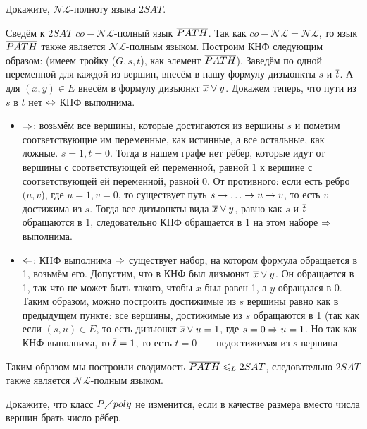 \documentclass[a4paper,12pt]{article}
\begin{document}
\begin{tasknum}{3}
	Докажите, $\mathcal{NL}$-полноту языка $2SAT$.
\end{tasknum}

\begin{solution}
	Сведём к $2SAT$ $co-\mathcal{NL}$-полный язык $\overline{PATH}$. Так как $co-\mathcal{NL} = \mathcal{NL}$, то язык $\overline{PATH}$ также является $\mathcal{NL}$-полным языком. Построим КНФ следующим образом: (имеем тройку ($G, s, t$), как элемент $\overline{PATH}$). Заведём по одной переменной для каждой из вершин, внесём в нашу формулу дизъюнкты $s$ и $\overline{t}$. А для $(x, y) \in E$ внесём в формулу дизъюнкт $\overline{x} \vee y$. Докажем теперь, что пути из $s$ в $t$ нет $\Leftrightarrow$ КНФ выполнима.
	
	\begin{itemize}
		\item $\Rightarrow$: возьмём все вершины, которые достигаются из вершины $s$ и пометим соответствующие им переменные, как истинные, а все остальные, как ложные. $s = 1, t = 0$. Тогда в нашем графе нет рёбер, которые идут от вершины с соответствующей ей переменной, равной $1$ к вершине с соответствующей ей переменной, равной $0$. От противного: если есть ребро $(u,v$), где $u = 1, v=0$, то существует путь $s \rightarrow \ldots \rightarrow u \rightarrow v$, то есть $v$ достижима из $s$. Тогда все дизъюнкты вида $\overline{x} \vee y$, равно как $s$ и $\overline{t}$ обращаются в 1, следовательно КНФ обращается в 1 на этом наборе $\Rightarrow$ выполнима. 
		
		\item $\Leftarrow$: КНФ выполнима $\Rightarrow$ существует набор, на котором формула обращается в 1, возьмём его. Допустим, что в КНФ был дизъюнкт $\overline{x} \vee y$. Он обращается в 1, так что не может быть такого, чтобы $x$ был равен 1, а $y$ обращался в 0. Таким образом, можно построить достижимые из $s$ вершины равно как в предыдущем пункте: все вершины, достижимые из $s$ обращаются в 1 (так как если $(s, u) \in E$, то есть дизъюнкт $\overline{s} \vee u = 1$, где $s = 0 \Rightarrow u = 1$. Но так как КНФ выполнима, то $\overline{t} = 1$, то есть $t=0$~---~недостижимая из $s$ вершина
	\end{itemize}
	
	Таким образом мы построили сводимость $\overline{PATH} \leqslant_L 2SAT$, следовательно $2SAT$ также является $\mathcal{NL}$-полным языком.
	
\end{solution}

\begin{tasknum}{4}
	Докажите, что класс $P \diagup poly$ не изменится, если в качестве размера вместо числа
	вершин брать число рёбер.
\end{tasknum}
\end{document}
